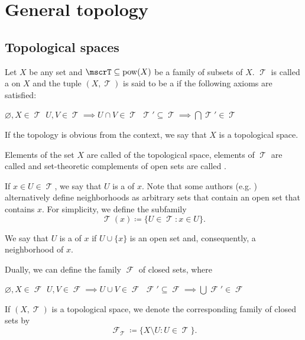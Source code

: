 \section{General topology}\label{sec:general_topology}
\subsection{Topological spaces}\label{subsec:topological_spaces}

\begin{definition}\label{def:topological_space}\mcite\cite[11]{Engelking1989}
  Let \( X \) be any set and \( \mscrT \subseteq \pow(X) \) be a family of subsets of \( X \). \( \mscrT \) is called a  on \( X \) and the tuple \( (X, \mscrT) \) is said to be a  if the following axioms are satisfied:
  \begin{thmenum}
     \( \varnothing, X \in \mscrT \)
     \( U, V \in \mscrT \implies U \cap V \in \mscrT \)
     \( \mscrT' \subseteq \mscrT \implies \bigcap \mscrT' \in \mscrT \)
  \end{thmenum}

  If the topology is obvious from the context, we say that \( X \) is a topological space.

  Elements of the set \( X \) are called  of the topological space, elements of \( \mscrT \) are called  and set-theoretic complements of open sets are called .

  If \( x \in U \in \mscrT \), we say that \( U \) is a  of \( x \). Note that some authors (e.g. \cite[38]{Kelley1955}) alternatively define neighborhoods as arbitrary sets that contain an open set that contains \( x \). For simplicity, we define the subfamily
  \begin{equation*}
    \mscrT(x) \coloneqq \{ U \in \mscrT \colon x \in U \}.
  \end{equation*}

  We say that \( U \) is a  of \( x \) if \( U \cup \{ x \} \) is an open set and, consequently, a neighborhood of \( x \).

  Dually, we can define the family \( \mscrF \) of closed sets, where
  \begin{thmenum}
     \( \varnothing, X \in \mscrF \)
     \( U, V \in \mscrF \implies U \cup V \in \mscrF \)
     \( \mscrF' \subseteq \mscrF \implies \bigcup \mscrF' \in \mscrF \)
  \end{thmenum}

  If \( (X, \mscrT) \) is a topological space, we denote the corresponding family of closed sets by
  \begin{equation*}
    \mscrF_\mscrT \coloneqq \{ X \setminus U \colon U \in \mscrT \}.
  \end{equation*}
\end{definition}

